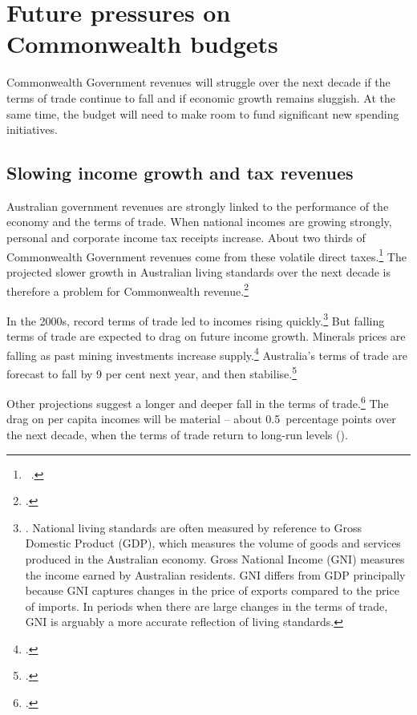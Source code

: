 \chapter{Future pressures on Commonwealth budgets}\label{chapter:FISCAL-3}
Commonwealth Government revenues will struggle over the next decade if the terms of trade continue to fall and if economic growth remains sluggish. At the same time, the budget will need to make room to fund significant new spending initiatives. 

\section{Slowing income growth and tax revenues}\label{sec:FISCAL-3-1}
Australian government revenues are strongly linked to the performance of the economy and the terms of trade. When national incomes are growing strongly, personal and corporate income tax receipts increase. About two thirds of Commonwealth Government revenues come from these volatile direct taxes.\footnote{\gao\ \textcite[][BP~No.~1, p.~5-18]{Treasury2014-Budget-Papers-2014-15}.}  The projected slower growth in Australian living standards over the next decade is therefore a problem for Commonwealth revenue.\footcite[][vii]{HenryTaxReview2010}

In the 2000s, record terms of trade led to incomes rising quickly.\footnote{\textcite{Carmody2013}. National living standards are often measured by reference to Gross Domestic Product (GDP), which measures the volume of goods and services produced in the Australian economy. Gross National Income (GNI) measures the income earned by Australian residents. GNI differs from GDP principally because GNI captures changes in the price of exports compared to the price of imports. In periods when there are large changes in the terms of trade, GNI is arguably a more accurate reflection of living standards.}  But falling terms of trade are expected to drag on future income growth. Minerals prices are falling as past mining investments increase supply.\footcites{Stevens2013}{MinifieCherastidthamMullerworthEtAl2013}  Australia’s terms of trade are forecast to fall by 9 per cent next year, and then stabilise.\footcite[][2--5]{Treasury2015BudgetPapers201516}   

Other projections suggest a longer and deeper fall in the terms of trade.\footcite{Treasury2014-Budget-Papers-2014-15}  The drag on per capita incomes will be material – about 0.5~percentage points over the next decade, when the terms of trade return to long-run levels ().

